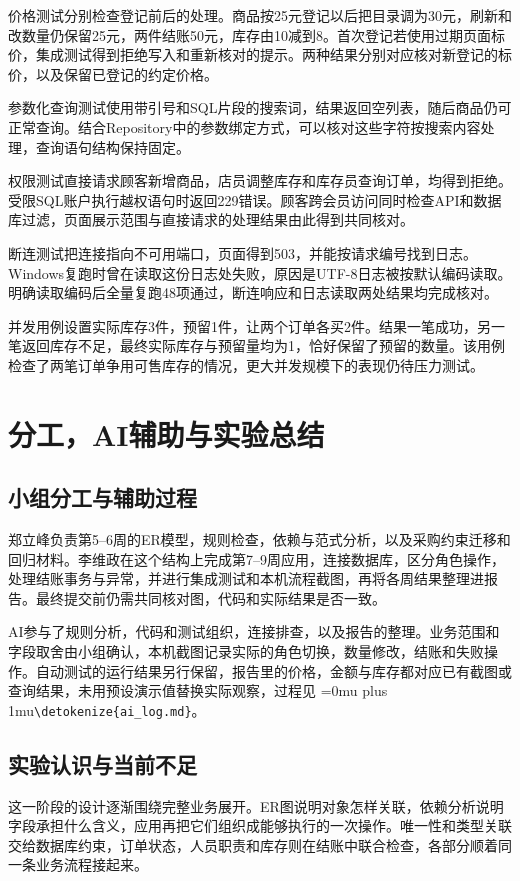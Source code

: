 \documentclass{SYSUReport}
\newcommand{\code}[1]{\begingroup\Urlmuskip=0mu plus 1mu\expandafter\nolinkurl\expandafter{\detokenize{#1}}\endgroup}
\begin{document}
价格测试分别检查登记前后的处理。商品按25元登记以后把目录调为30元，刷新和改数量仍保留25元，两件结账50元，库存由10减到8。首次登记若使用过期页面标价，集成测试得到拒绝写入和重新核对的提示。两种结果分别对应核对新登记的标价，以及保留已登记的约定价格。

参数化查询测试使用带引号和SQL片段的搜索词，结果返回空列表，随后商品仍可正常查询。结合Repository中的参数绑定方式，可以核对这些字符按搜索内容处理，查询语句结构保持固定。

权限测试直接请求顾客新增商品，店员调整库存和库存员查询订单，均得到拒绝。受限SQL账户执行越权语句时返回229错误。顾客跨会员访问同时检查API和数据库过滤，页面展示范围与直接请求的处理结果由此得到共同核对。

断连测试把连接指向不可用端口，页面得到503，并能按请求编号找到日志。Windows复跑时曾在读取这份日志处失败，原因是UTF-8日志被按默认编码读取。明确读取编码后全量复跑48项通过，断连响应和日志读取两处结果均完成核对。

并发用例设置实际库存3件，预留1件，让两个订单各买2件。结果一笔成功，另一笔返回库存不足，最终实际库存与预留量均为1，恰好保留了预留的数量。该用例检查了两笔订单争用可售库存的情况，更大并发规模下的表现仍待压力测试。

\clearpage
\section{分工，AI辅助与实验总结}
\subsection{小组分工与辅助过程}
郑立峰负责第5--6周的ER模型，规则检查，依赖与范式分析，以及采购约束迁移和回归材料。李维政在这个结构上完成第7--9周应用，连接数据库，区分角色操作，处理结账事务与异常，并进行集成测试和本机流程截图，再将各周结果整理进报告。最终提交前仍需共同核对图，代码和实际结果是否一致。

AI参与了规则分析，代码和测试组织，连接排查，以及报告的整理。业务范围和字段取舍由小组确认，本机截图记录实际的角色切换，数量修改，结账和失败操作。自动测试的运行结果另行保留，报告里的价格，金额与库存都对应已有截图或查询结果，未用预设演示值替换实际观察，过程见 \code{ai_log.md}。

\subsection{实验认识与当前不足}
这一阶段的设计逐渐围绕完整业务展开。ER图说明对象怎样关联，依赖分析说明字段承担什么含义，应用再把它们组织成能够执行的一次操作。唯一性和类型关联交给数据库约束，订单状态，人员职责和库存则在结账中联合检查，各部分顺着同一条业务流程接起来。
\end{document}
